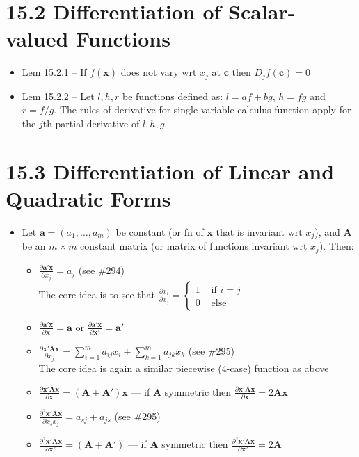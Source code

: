 \documentclass[a4paper]{article}
\newcommand{\cg}{\color{gray}}
\newcommand{\fs}{\footnotesize}
\newcommand{\mb}{\mathbf}
\begin{document}
\section*{15.2 Differentiation of Scalar-valued Functions}
\begin{itemize}
\setlength{\parindent}{0mm}
\item Lem 15.2.1 \--- If $f(\mathbf{x})$ does not vary wrt $x_j$ at $\mathbf{c}$ then $D_jf(\mathbf{c})=0$
\item Lem 15.2.2 \--- Let $l,h,r$ be functions defined as:
$l=af+bg$, $h=fg$ and $r=f/g$. The rules of derivative for single-variable calculus function apply for the $j$th partial derivative of $l,h,g$.
\end{itemize}
\section*{15.3 Differentiation of Linear and Quadratic Forms}
\begin{itemize}
\setlength{\parindent}{0mm}
\item Let $\mathbf{a}=(a_1,\hdots,a_m)$ be constant (or fn of $\mb{x}$ that is invariant wrt $x_j$), and $\mb{A}$ be an $m\times m$ constant matrix (or matrix of functions invariant wrt $x_j$). Then:
\begin{itemize}
\setlength{\parindent}{0mm}
\item $\frac{\partial  \mb{a'x}}{\partial x_j}=a_j$ (see \#294)\\
{\cg\fs The core idea is to see that $\frac{\partial x_i}{\partial x_j}=\begin{cases}1 &\text{ if }i=j\\0& \text{ else}\end{cases}$}
\item $\frac{\partial  \mb{a'x}}{\partial \mathbf{x}}=\mb{a}$ or $\frac{\partial  \mb{a'x}}{\partial \mathbf{x}'}=\mb{a}'$
\item $\frac{\partial \mb{x'Ax}}{\partial x_j} = \sum\limits_{i=1}^m a_{ij}x_i+\sum\limits_{k=1}^{m} a_{jk}x_k$ (see \#295)\\ 
{\cg\fs The core idea is again a similar piecewise (4-case) function as above}
\item $\frac{\partial \mb{x'Ax}}{\partial \mb{x}} = (\mathbf{A+A'})\mathbf{x}$ \---- if $\mb{A}$ symmetric then $\frac{\partial \mb{x'Ax}}{\partial \mb{x}} = 2\mathbf{Ax}$
\item $\frac{\partial^2 \mb{x'Ax}}{\partial x_s x_j} = a_{sj}+a_{js}$ (see \#295)
\item $\frac{\partial^2 \mb{x'Ax}}{\partial \mb{x}^2} = (\mathbf{A+A'})$ \---- if $\mb{A}$ symmetric then $\frac{\partial^2 \mb{x'Ax}}{\partial \mb{x}^2} = 2\mathbf{A}$
\end{itemize}
\end{itemize}
\end{document}
